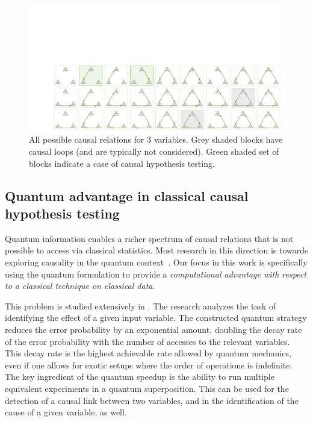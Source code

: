 \begin{figure}[h]
\centering %
\includegraphics[clip, trim=3cm 0cm 0cm 9cm,width=0.99\textwidth]{plot/3vci.pdf}
\caption{All possible causal relations for 3 variables. Grey shaded blocks have causal loops (and are typically not considered). Green shaded set of blocks indicate a case of causal hypothesis testing.}
\label{fig:3vci}
\end{figure}


\subsection{Quantum advantage in classical causal hypothesis testing}

Quantum information enables a richer spectrum of causal relations that is not possible to access via classical statistics.
Most research in this direction is towards exploring causality in the quantum context~\cite{costa2016quantum,giarmatzi2019quantum,javidian2021quantum,bai2021quantum,bai2020efficient,bavaresco2021strict}.
Our focus in this work is specifically using the quantum formulation to provide a \textit{computational advantage with respect to a classical technique on classical data}.

This problem is studied extensively in \cite{chiribella2019quantum}.
The research analyzes the task of identifying the effect of a given input variable.
The constructed quantum strategy reduces the error probability by an exponential amount, doubling the decay rate of the error probability with the number of accesses to the relevant variables. 
This decay rate is the highest achievable rate allowed by quantum mechanics, even if one allows for exotic setups where the order of operations is indefinite.
The key ingredient of the quantum speedup is the ability to run multiple equivalent experiments in a quantum superposition.
This can be used for the detection of a causal link between two variables, and in the identification of the cause of a given variable, as well.

